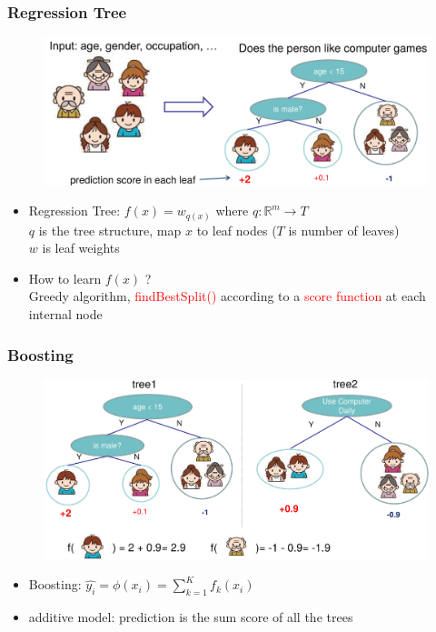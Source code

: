 \documentclass{beamer}
\begin{document}
\begin{frame}
	\frametitle{Regression Tree}
		\begin{figure}
			\includegraphics[width=1\linewidth]{figs/regressiontree}
		\end{figure}
		
		\begin{itemize}
			\item Regression Tree: $f(x)=w_{q(x)}$ where $q: \mathbb{R}^m \rightarrow T$\\ 
			$q$ is the tree structure, map $x$ to leaf nodes ($T$ is number of leaves) \\
			$w$ is leaf weights		
			\item How to learn $f(x)$ ? \\ 
			Greedy algorithm, \textcolor{red}{findBestSplit()} according to a \textcolor{red}{score function} at each internal node
			
		\end{itemize}
	
\end{frame}

\begin{frame}
	\frametitle{Boosting}
	\begin{figure}
		\includegraphics[width=1\linewidth]{figs/boostingtree}
	\end{figure}
	
	\begin{itemize}
		\item Boosting: $\widehat{y_i}=\phi(x_i)=\sum_{k=1}^{K}f_k(x_i)$  
		\item additive model: prediction is the sum score of all the trees
	\end{itemize}
	
\end{frame}
\end{document}
